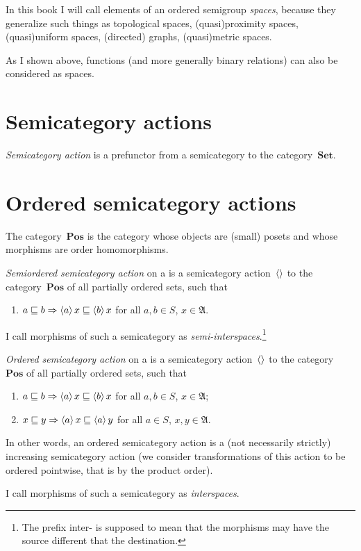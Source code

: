 In this book I will call elements of an ordered semigroup \emph{spaces}, because they generalize such things as topological spaces, (quasi)proximity spaces, (quasi)uniform spaces, (directed) graphs, (quasi)metric spaces.

As I shown above, functions (and more generally binary relations) can also be considered as spaces.

\chapter{Semicategory actions}

\begin{defn}
\emph{Semicategory action} is a prefunctor from a semicategory to the category~$\mathbf{Set}$.
\end{defn}

\chapter{Ordered semicategory actions}

The category~$\mathbf{Pos}$ is the category whose objects are (small) posets and whose morphisms are order homomorphisms.

\begin{defn}
\emph{Semiordered semicategory action} on a is a semicategory action~$\left\langle \right\rangle$ to the category~$\mathbf{Pos}$ of all partially ordered sets, such that
\begin{enumerate}
\item $a\sqsubseteq b\Rightarrow\left\langle a\right\rangle x\sqsubseteq \left\langle b\right\rangle x$ for all $a,b\in S$, $x\in\mathfrak{A}$.
\end{enumerate}
I call morphisms of such a semicategory as \emph{semi-interspaces}.\footnote{The prefix inter- is supposed to mean that the morphisms may have the source different that the destination.}
\end{defn}

\begin{defn}
\emph{Ordered semicategory action} on a is a semicategory action~$\left\langle \right\rangle$ to the category~$\mathbf{Pos}$ of all partially ordered sets, such that
\begin{enumerate}
\item $a\sqsubseteq b\Rightarrow\left\langle a\right\rangle x\sqsubseteq \left\langle b\right\rangle x$ for all $a,b\in S$, $x\in\mathfrak{A}$;
\item $x\sqsubseteq y\Rightarrow\left\langle a\right\rangle x\sqsubseteq \left\langle a\right\rangle y$ for all $a\in S$, $x,y\in\mathfrak{A}$.
\end{enumerate}
In other words, an ordered semicategory action is a (not necessarily strictly) increasing semicategory action (we consider transformations of this action to be ordered pointwise, that is by the product order).

I call morphisms of such a semicategory as \emph{interspaces}.
\end{defn}

